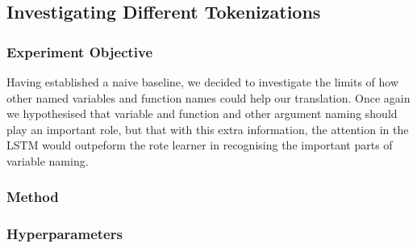 \subsection{Investigating Different Tokenizations} %
\label{sub:investigating_different_tokenizations}

\subsubsection{Experiment Objective} %

Having established a naive baseline, we decided to investigate the limits of how other named variables and function names could help our translation.
Once again we hypothesised that variable and function and other argument naming should play an important role, but that with this extra information, the attention in the LSTM would outpeform the rote learner in recognising the important parts of variable naming.

\subsubsection{Method} %


\subsubsection{Hyperparameters}


